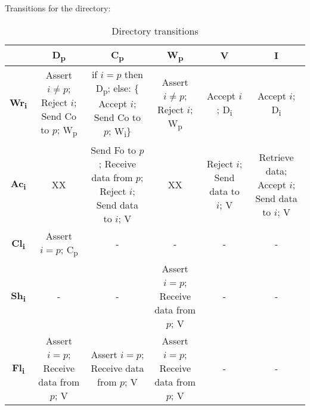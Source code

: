 \documentclass{article}
\begin{document}
Transitions for the directory:

\begin{table}[]
\centering
\caption{Directory transitions}
\label{directory-protocol}
\begin{tabular}{|c|c|c|c|c|c|}
\hline
   & \textbf{D\textsubscript{p}}                        & \textbf{C\textsubscript{p}}                        & \textbf{W\textsubscript{p}}                        & \textbf{V}  & \textbf{I}     \\ \hline
\textbf{Wr\textsubscript{i}} & \makecell{Assert $i \neq p$; \\ Reject $i$; \\ Send Co to $p$; \\ W\textsubscript{p}} & \makecell{if $i = p$ then D\textsubscript{p}; \\ else: \{ Accept $i$; \\ Send Co to $p$; \\ W\textsubscript{i}\}} & \makecell{Assert $i \neq p$; \\ Reject $i$; \\ W\textsubscript{p}} & \makecell{Accept $i$; \\ D\textsubscript{i}} & \makecell{Accept $i$; \\ D\textsubscript{i}} \\ \hline
\textbf{Ac\textsubscript{i}} & XX & \makecell{Send Fo to $p$; \\ Receive data from $p$; \\ Reject $i$; \\ Send data to $i$; \\ V} & XX & \makecell{Reject $i$; \\ Send data to $i$; \\ V} & \makecell{Retrieve data; \\ Accept $i$; \\ Send data to $i$; \\ V} \\ \hline
\textbf{Cl\textsubscript{i}} & \makecell{Assert $i = p$; \\ C\textsubscript{p}} & - & - & - & - \\ \hline
\textbf{Sh\textsubscript{i}} & - & - & \makecell{Assert $i = p$; \\ Receive data from $p$; \\ V} & - & - \\ \hline
\textbf{Fl\textsubscript{i}} & \makecell{Assert $i = p$; \\ Receive data from $p$; \\ V} & \makecell{Assert $i = p$; \\ Receive data from $p$; \\ V} & \makecell{Assert $i = p$; \\ Receive data from $p$; \\ V} & - & - \\ \hline

\end{tabular}
\end{table}
\end{document}
